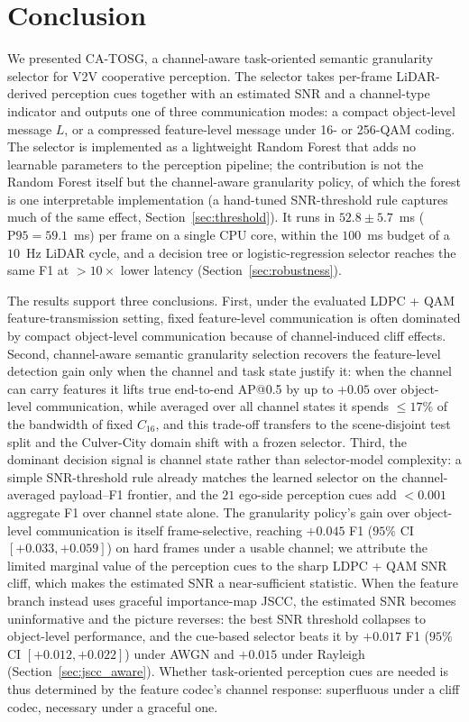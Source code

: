 \documentclass[journal]{IEEEtran}
\newcommand{\method}{CA-TOSG}
\begin{document}
\section{Conclusion}

We presented \method{}, a channel-aware task-oriented semantic granularity selector for V2V cooperative perception. The selector takes per-frame LiDAR-derived perception cues together with an estimated SNR and a channel-type indicator and outputs one of three communication modes: a compact object-level message $L$, or a compressed feature-level message under 16- or 256-QAM coding. The selector is implemented as a lightweight Random Forest that adds no learnable parameters to the perception pipeline; the contribution is not the Random Forest itself but the channel-aware granularity policy, of which the forest is one interpretable implementation (a hand-tuned SNR-threshold rule captures much of the same effect, Section~\ref{sec:threshold}). It runs in $52.8 \pm 5.7$~ms ($\mathrm{P95} = 59.1$~ms) per frame on a single CPU core, within the $100$~ms budget of a $10$~Hz LiDAR cycle, and a decision tree or logistic-regression selector reaches the same F1 at $>10\times$ lower latency (Section~\ref{sec:robustness}).

The results support three conclusions. First, under the evaluated LDPC + QAM feature-transmission setting, fixed feature-level communication is often dominated by compact object-level communication because of channel-induced cliff effects. Second, channel-aware semantic granularity selection recovers the feature-level detection gain only when the channel and task state justify it: when the channel can carry features it lifts true end-to-end AP@0.5 by up to $+0.05$ over object-level communication, while averaged over all channel states it spends $\le17\%$ of the bandwidth of fixed $C_{16}$, and this trade-off transfers to the scene-disjoint test split and the Culver-City domain shift with a frozen selector. Third, the dominant decision signal is channel state rather than selector-model complexity: a simple SNR-threshold rule already matches the learned selector on the channel-averaged payload--F1 frontier, and the $21$ ego-side perception cues add $<0.001$ aggregate F1 over channel state alone. The granularity policy's gain over object-level communication is itself frame-selective, reaching $+0.045$ F1 ($95\%$ CI $[+0.033,+0.059]$) on hard frames under a usable channel; we attribute the limited marginal value of the perception cues to the sharp LDPC + QAM SNR cliff, which makes the estimated SNR a near-sufficient statistic. When the feature branch instead uses graceful importance-map JSCC, the estimated SNR becomes uninformative and the picture reverses: the best SNR threshold collapses to object-level performance, and the cue-based selector beats it by $+0.017$ F1 ($95\%$ CI $[+0.012,+0.022]$) under AWGN and $+0.015$ under Rayleigh (Section~\ref{sec:jscc_aware}). Whether task-oriented perception cues are needed is thus determined by the feature codec's channel response: superfluous under a cliff codec, necessary under a graceful one.





\end{document}
